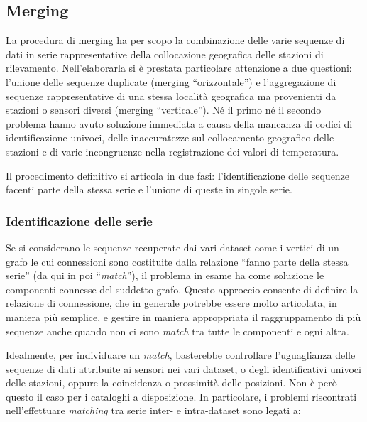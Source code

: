 \subsection{Merging}\label{ch:merging}
La procedura di merging ha per scopo la combinazione delle varie sequenze di dati in serie rappresentative della collocazione geografica delle stazioni di rilevamento. Nell'elaborarla si è prestata particolare attenzione a due questioni: l'unione delle sequenze duplicate (merging ``orizzontale'') e l'aggregazione di sequenze rappresentative di una stessa località geografica ma provenienti da stazioni o sensori diversi (merging ``verticale''). Né il primo né il secondo problema hanno avuto soluzione immediata a causa della mancanza di codici di identificazione univoci, delle inaccuratezze sul collocamento geografico delle stazioni e di varie incongruenze nella registrazione dei valori di temperatura.

Il procedimento definitivo si articola in due fasi: l'identificazione delle sequenze facenti parte della stessa serie e l'unione di queste in singole serie.

\subsubsection{Identificazione delle serie}
Se si considerano le sequenze recuperate dai vari dataset come i vertici di un grafo le cui connessioni sono costituite dalla relazione ``fanno parte della stessa serie'' (da qui in poi ``\emph{match}''), il problema in esame ha come soluzione le componenti connesse del suddetto grafo. Questo approccio consente di definire la relazione di connessione, che in generale potrebbe essere molto articolata, in maniera più semplice, e gestire in maniera approppriata il raggruppamento di più sequenze anche quando non ci sono \emph{match} tra tutte le componenti e ogni altra.

Idealmente, per individuare un \emph{match}, basterebbe controllare l'uguaglianza delle sequenze di dati attribuite ai sensori nei vari dataset, o degli identificativi univoci delle stazioni, oppure la coincidenza o prossimità delle posizioni. Non è però questo il caso per i cataloghi a disposizione. In particolare, i problemi riscontrati nell'effettuare \emph{matching} tra serie inter- e intra-dataset sono legati a:

